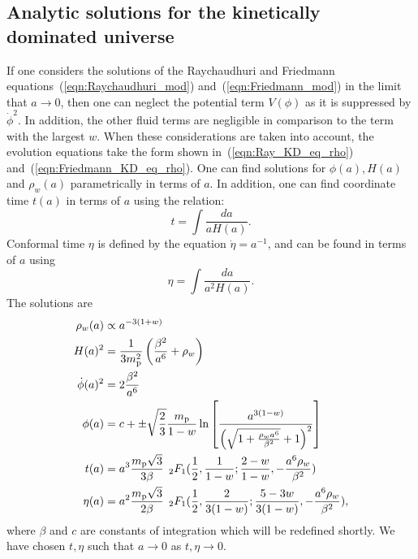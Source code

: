 \subsection{Analytic solutions for the kinetically dominated universe} 
If one considers the solutions of the Raychaudhuri and Friedmann equations~(\ref{eqn:Raychaudhuri_mod}) and~(\ref{eqn:Friedmann_mod}) in the limit that $a\to0$, then one can neglect the potential term $V(\phi)$ as it is suppressed by $\dot{\phi}^2$. In addition, the other fluid terms are negligible in comparison to the term with the largest $w$.  When these considerations are taken into account, the evolution equations take the form shown in~(\ref{eqn:Ray_KD_eq_rho}) and~(\ref{eqn:Friedmann_KD_eq_rho}). One can find solutions for $\phi(a),H(a)$ and $\rho_w(a)$ parametrically in terms of $a$.  In addition, one can find coordinate time $t(a)$ in terms of $a$ using the relation:
%
\begin{equation}
  t = \int \frac{da}{aH(a)}.
\end{equation}
%
Conformal time $\eta$ is defined by the equation $\dot{\eta} =
a^{-1}$, and can be found in terms of $a$ using
%
\begin{equation}
  \eta = \int \frac{da}{a^2H(a)}.
\end{equation}
%
The solutions are
%
\begin{align}
  \rho_w(a) 
  &\propto 
  a^{-3(1+w)} 
  \\
  H(a)^2 
  &= 
  \frac{1}{3m_{\mathrm{p}}^2}\left(\frac{\beta^2}{a^6} + \rho_w\right)  
  \label{eqn:H_of_a}
  \\
  \dot{\phi}(a)^2
  &=
  2\frac{\beta^2}{a^6} 
  \label{eqn:dotphi_of_a}
  \\
  \phi(a)
  &=
  c + \pm
  \sqrt{\frac{2}{3}}\frac{m_{\mathrm{p}}}{1-w} \ln \left[ 
  \frac 
  {{a}^{3(1-w)}}
  {\left(\sqrt {1+\frac{\rho_wa^{6}}{\beta^2}}+1\right)^2} 
  \right]  
  \label{eqn:phi_of_a}
  \\
  t(a)
  &=
  a^3 \frac{m_{\mathrm{p}}\sqrt{3}}{3\beta} 
  \:\: 
  {_2F_1}(
  \frac{1}{2},
  \frac{1}{1-w};
  \frac{2-w}{1-w},
  -\frac{a^6\rho_w}{\beta^2}
  ) 
  \label{eqn:t_of_a}
  \\
  \eta(a) 
  &= 
  a^2 \frac{m_{\mathrm{p}}\sqrt{3}}{2\beta}
  \:\: 
  {_2F_1}(
  \frac{1}{2},
  \frac{2}{3(1-w)};
  \frac{5-3w}{3(1-w)},
  -\frac{a^6\rho_w}{\beta^2}
  ),
  \label{eqn:eta_of_a}
\end{align}
%
where $\beta$ and $c$ are constants of integration which will be redefined shortly. We have chosen $t,\eta$ such that $a\to0$ as $t,\eta \to 0$.


